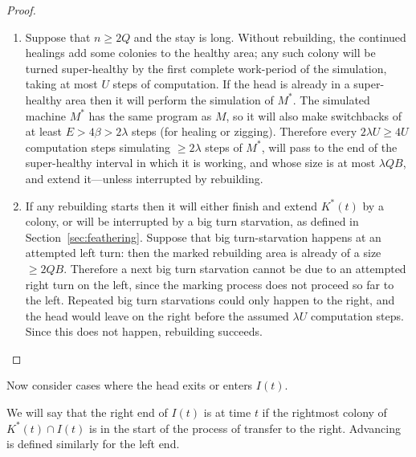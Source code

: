 \documentclass[11pt]{memoir}
\theoremstyle{definition} %
\renewcommand{\ge}{\geq}
\def\B{B}
\def\U{U}
\newcommand{\E}{E} %
\newcommand{\Q}{Q} %
\begin{document}
\begin{proof}
\begin{enumerate}
\item\label{i:long-stay}  Suppose that \( n\ge 2\Q \) and the stay is long.
  Without rebuilding, the continued healings add some colonies to the healthy area; any such colony will be
  turned super-healthy by the first complete work-period of the simulation, taking at most \( \U \)
  steps of computation.
  If the head is already in a super-healthy area then it will perform the simulation of \( M^{*} \).
  The simulated machine \( M^{*} \) has the same program as \( M \), so it will also
  make switchbacks of at least \( \E>4\beta>2\lambda \) steps (for healing or zigging).
  Therefore every \( 2\lambda\U\ge 4\U \) computation steps
  simulating \( \ge 2\lambda \) steps of \( M^{*} \),
  will pass to the end of the super-healthy interval in which it is working, and
  whose size is at most \( \lambda\Q\B \), and extend it---unless interrupted by rebuilding.

\item  If any rebuilding starts then it will either finish and extend \( K^{*}(t) \) by a colony,
  or will be interrupted by a big turn starvation, as defined in Section~\ref{sec:feathering}.
  Suppose that big turn-starvation happens at an attempted left turn:
  then the marked rebuilding area is already of a size \( \ge 2\Q\B \).
  Therefore a next big turn starvation cannot be due to an attempted right turn on the left, since
  the marking process does not proceed so far to the left.
  Repeated big turn starvations could only happen to the right, and the head would leave on the right before the
  assumed \( \lambda\U \) computation steps.
  Since this does not happen, rebuilding succeeds.
\end{enumerate}
\end{proof}

Now consider cases where the head exits or enters \( I(t) \).

\begin{definition}\label{def:advancing-end}
  We will say that the right end of \( I(t) \) is  at time \( t \)
  if the rightmost colony of \( K^{*}(t)\cap I(t) \) is in the start of the process of transfer to the right.
  Advancing is defined similarly for the left end.
\end{definition}
\end{document}

